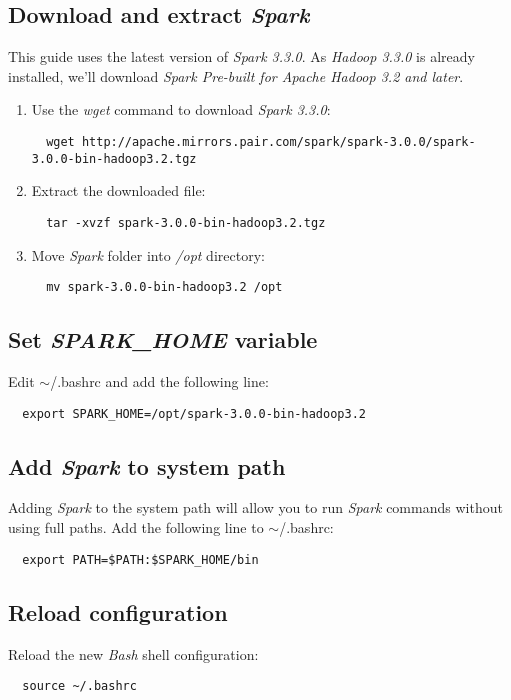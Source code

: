 \documentclass{article}
\begin{document}
  \subsection{Download and extract \emph{Spark}}
  This guide uses the latest version of \emph{Spark 3.3.0}. As \emph{Hadoop 3.3.0} is
  already installed, we'll download \emph{Spark Pre-built for Apache Hadoop 3.2 and later}.
  \begin{enumerate}
  \item Use the \emph{wget} command to download \emph{Spark 3.3.0}:
  \begin{verbatim}
  wget http://apache.mirrors.pair.com/spark/spark-3.0.0/spark-3.0.0-bin-hadoop3.2.tgz
  \end{verbatim}

  \item Extract the downloaded file:
  \begin{verbatim}
  tar -xvzf spark-3.0.0-bin-hadoop3.2.tgz
  \end{verbatim}

  \item Move \emph{Spark} folder into \emph{/opt} directory:
  \begin{verbatim}
  mv spark-3.0.0-bin-hadoop3.2 /opt
  \end{verbatim}
  \end{enumerate}

  \subsection{Set \emph{SPARK\_HOME} variable}
  Edit $\sim$/.bashrc and add the following line:
  \begin{verbatim}
  export SPARK_HOME=/opt/spark-3.0.0-bin-hadoop3.2
  \end{verbatim}

  \subsection{Add \emph{Spark} to system path}
  Adding \emph{Spark} to the system path will allow you to run \emph{Spark} commands without
  using full paths. Add the following line to $\sim$/.bashrc:
  \begin{verbatim}
  export PATH=$PATH:$SPARK_HOME/bin
  \end{verbatim}

  \subsection{Reload configuration}
  Reload the new \emph{Bash} shell configuration:
  \begin{verbatim}
  source ~/.bashrc
  \end{verbatim}
\end{document}
